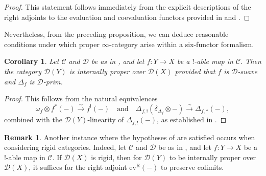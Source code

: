 \documentclass[oneside, hidelinks, 12pt, a4paper,reqno]{amsart}
\theoremstyle{plain}
\theoremstyle{definition}
\newtheorem{remark}[remark]{Remark}
\theoremstyle{plain}
\newtheorem{corollary}[corollary]{Corollary}
\newcommand{\cC}{\mathscr C}
\newcommand{\cD}{\mathscr D}
\newcommand{\cat}{$\infty$-category }
\newcommand{\ev}{\mathrm{ev}}
\begin{document}
\begin{proof}
    This statement follows immediately from the explicit descriptions of the right adjoints to the evaluation and coevaluation functors provided in  and .
\end{proof}

Nevertheless, from the preceding proposition, we can deduce reasonable conditions under which proper \cat arise within a six-functor formalism.

\begin{corollary}\label{cor: proper cat in 6 ff}
    Let $\cC$ and $\cD$ be as in , and let $f \colon Y \to X$ be a $!$-able map in $\cC$. Then the category $\cD(Y)$ is internally proper over $\cD(X)$ provided that $f$ is $\cD$-suave and $\Delta_f$ is $\cD$-prim.
\end{corollary}

\begin{proof}
    This follows from the natural equivalences
    $$
    \omega_f \otimes f^*(-) \xrightarrow{\sim} f^!(-)  \quad \text{and} \quad \Delta_{f,!}(\delta_{\Delta_f} \otimes -) \xrightarrow{\sim} \Delta_{f,\ast}(-),
    $$
    combined with the $\cD(Y)$-linearity of $\Delta_{f,!}(-)$, as established in .
\end{proof}

\begin{remark}
    Another instance where the hypotheses of  are satisfied occurs when considering rigid categories. Indeed, let $\cC$ and $\cD$ be as in , and let $f \colon Y \to X$ be a $!$-able map in $\cC$. If $\cD(X)$ is rigid, then for $\cD(Y)$ to be internally proper over $\cD(X)$, it suffices for the right adjoint $\ev^{\mathrm{R}}(-)$ to preserve colimits.
\end{remark}
\end{document}
